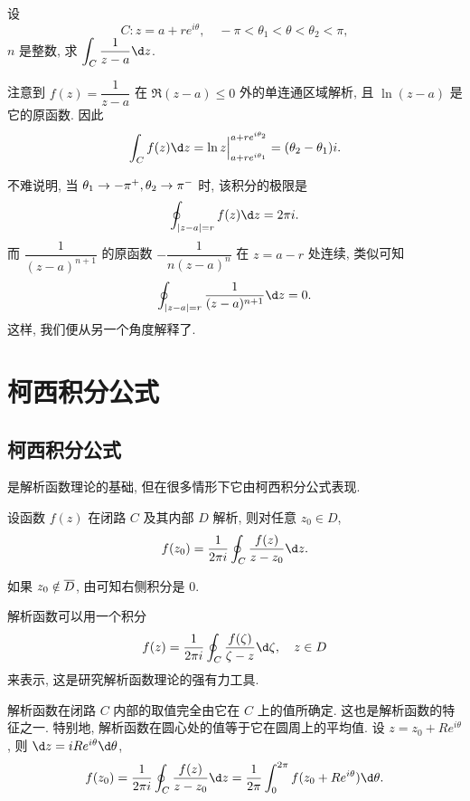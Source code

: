 \begin{example}
  设
  \[
    C: z=a+re^{i\theta}, \quad -\pi<\theta_1<\theta<\theta_2<\pi,
  \]
  $n$ 是整数, 求 $\displaystyle\int_C \dfrac1{z-a}\d z$.
\end{example}

\begin{solution}
  注意到 $f(z)=\dfrac1{z-a}$ 在 $\Re(z-a)\le0$ 外的单连通区域解析, 且 $\ln(z-a)$ 是它的原函数.
  因此
  \[
     \int_C f(z)\d z
    =\ln z\Big|_{a+re^{i\theta_1}}^{a+re^{i\theta_2}}
    =(\theta_2-\theta_1)i.
  \]
\end{solution}

不难说明, 当 $\theta_1\rightarrow -\pi^+,\theta_2\rightarrow \pi^-$ 时, 该积分的极限是
\[
  \oint_{|z-a|=r}f(z)\d z=2\pi i.
\]
而 $\dfrac1{(z-a)^{n+1}}$ 的原函数 $-\dfrac1{n(z-a)^n}$ 在 $z=a-r$ 处连续, 类似可知
\[
  \oint_{|z-a|=r}\dfrac1{(z-a)^{n+1}}\d z=0.
\]
这样, 我们便从另一个角度解释了.


\section{柯西积分公式}

\subsection{柯西积分公式}

\thmCG{}是解析函数理论的基础, 但在很多情形下它由柯西积分公式表现.

\begin{theorem}[柯西积分公式]\label{thm:Cauchy-integral}
  设函数 $f(z)$ 在闭路 $C$ 及其内部 $D$ 解析, 则对任意 $z_0\in D$,
  \[
    f(z_0)=\frac1{2\pi i}\oint_C\frac{f(z)}{z-z_0}\d z.
  \]
\end{theorem}

如果 $z_0\notin \overline D$, 由\thmCG{}可知右侧积分是 $0$.

解析函数可以用一个积分
\[
  f(z)=\frac1{2\pi i}\oint_C\frac{f(\zeta)}{\zeta-z}\d\zeta,\quad z\in D
\]
来表示, 这是研究解析函数理论的强有力工具.

解析函数在闭路 $C$ 内部的取值完全由它在 $C$ 上的值所确定. 这也是解析函数的特征之一.
特别地, 解析函数在圆心处的值等于它在圆周上的平均值.
设 $z=z_0+Re^{i\theta}$, 则 $\d z=iRe^{i\theta}\d\theta$,
\[
  f(z_0)=\frac1{2\pi i}\oint_C\frac{f(z)}{z-z_0}\d z=\frac1{2\pi}\int_0^{2\pi}f(z_0+Re^{i\theta})\d\theta.
\]

